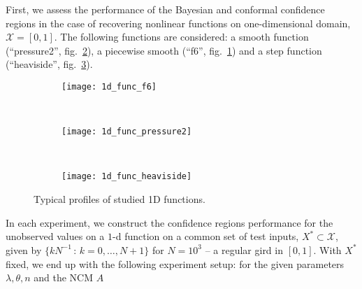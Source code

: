 \documentclass[a4paper,14pt]{extarticle}
\newcommand{\Xcal}{\mathcal{X}}
\begin{document}
First, we assess the performance of the Bayesian and conformal confidence regions
in the case of recovering nonlinear functions on one-dimensional domain, $\Xcal =
[0, 1]$. The following functions are considered: a smooth function (``pressure2'',
fig.~\ref{fig:1dfunc_pressure2}), a piecewise smooth (``f6'', fig.~\ref{fig:1dfunc_f6})
and a step function (``heaviside'', fig.~\ref{fig:1dfunc_heaviside}).
\begin{figure}[t, width=0.5\textwidth]
  \centering
  \begin{subfigure}[b]{0.3\linewidth}
    \texttt{[image: 1d\_func\_f6]}
    \caption{} \label{fig:1dfunc_f6}
  \end{subfigure}~
  \begin{subfigure}[b]{0.3\linewidth}
    \texttt{[image: 1d\_func\_pressure2]}
    \caption{} \label{fig:1dfunc_pressure2}
  \end{subfigure}~
  \begin{subfigure}[b]{0.3\linewidth}
    \texttt{[image: 1d\_func\_heaviside]}
    \caption{} \label{fig:1dfunc_heaviside}
  \end{subfigure}
  \caption{Typical profiles of studied 1D functions.}\label{fig:animals}
\end{figure}
In each experiment, we construct the confidence regions performance for the unobserved
values on a $1$-d function on a common set of test inputs, $X^* \subset \Xcal$,
given by $\{k N^{-1}\,:\,k=0,\ldots, N+1\}$ for $N=10^3$ -- a regular gird in $[0, 1]$.
With $X^*$ fixed, we end up with the following experiment setup: for the given
parameters $\lambda, \theta, n$ and the NCM $A$
\end{document}
